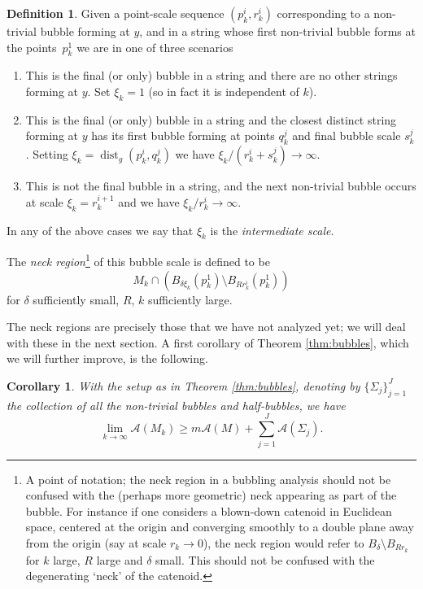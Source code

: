 \documentclass[JEP,XML,SOM,Unicode]{cedram}
\let\mathcal\mathscr
\newcounter{cas}
\DeclareMathOperator{\dist}{dist}
\newtheorem{cor}[thm]{Corollary}
\theoremstyle{definition}
\newtheorem{definition}[thm]{Definition}
\begin{document}
\begin{definition}\label{def:int}
Given a point-scale sequence $(p^i_k, r^i_k)$ corresponding to a non-trivial bubble forming at $y$, and in a string whose first non-trivial bubble forms at the points~$p^1_k$ we are in one of three scenarios
\begin{enumerate}
\item This is the final (or only) bubble in a string and there are no other strings forming at $y$. Set $\xi_k = 1$ (so in fact it is independent of $k$).
\item This is the final (or only) bubble in a string and the closest distinct string forming at $y$ has its first bubble forming at points $q^j_k$ and final bubble scale $s^j_k$. Setting $\xi_k = \dist_g(p^i_k,q^j_k)$ we have $\xi_k/(r^i_k+s^j_k) \to \infty$.
\item This is not the final bubble in a string, and the next non-trivial bubble occurs at scale $\xi_k = r^{i+1}_k$ and we have $\xi_k/r^i_k \to \infty$.
\end{enumerate}
In any of the above cases we say that $\xi_k$ is the \emph{intermediate scale}.

The \emph{neck region}\footnote{A point of notation; the neck region in a bubbling analysis should not be confused with the (perhaps more geometric) neck appearing as part of the bubble. For instance if one considers a blown-down catenoid in Euclidean space, centered at the origin and converging smoothly to a double plane away from the origin (say at scale $r_k \to 0$), the neck region would refer to $B_{\delta}\setminus B_{Rr_k}$ for $k$ large, $R$ large and $\delta$ small. This should not be confused with the degenerating `neck' of the catenoid.} of this bubble scale is defined to be
$$M_k\cap (B_{\delta \xi_k}(p^1_k)\setminus B_{R r^i_k}(p^1_k))$$
for $\delta$ sufficiently small, $R$, $k$ sufficiently large.
\end{definition}

The neck regions are precisely those that we have not analyzed yet; we will deal with these in the next section.
A first corollary of Theorem \ref{thm:bubbles}, which we will further improve, is the following.

\begin{cor}\label{cor:bubbles}
With the setup as in Theorem \ref{thm:bubbles}, denoting by $\{\Sigma_j\}_{j=1}^J$ the collection of all the non-trivial bubbles and half-bubbles, we have
\begin{equation*}
\lim_{k\to\infty}\mathcal{A}(M_k) \geq m\mathcal{A}(M) + \sum_{j=1}^J \mathcal{A}(\Sigma_j).
\end{equation*}
\end{cor}
\end{document}
